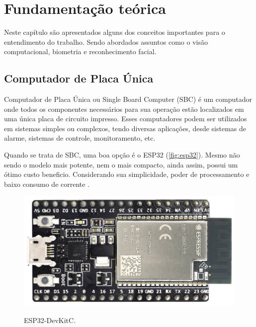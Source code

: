 \chapter{Fundamentação te\'orica}\label{cap:referencialTeorico}

Neste capítulo são apresentados alguns dos conceitos importantes para o entendimento
do trabalho. Sendo abordados assuntos como o visão computacional, biometria e 
reconhecimento facial.

\section{Computador de Placa Única}\label{sec:formatacaoTexto3}

Computador de Placa Única ou Single Board Computer (SBC) é um computador onde todos 
os componentes necessários para sua operação estão localizados em uma única placa de 
circuito impresso. Esses computadores podem ser utilizados em sistemas simples ou complexos, 
tendo diversas aplicações, desde sistemas de alarme, sistemas de controle, 
monitoramento, etc.

Quando se trata de SBC, uma boa opção é o ESP32 (\autoref{fig:esp32}). Mesmo não 
sendo o modelo mais potente, nem o mais compacto, ainda assim, possui um ótimo custo 
beneficio. Considerando sua simplicidade, poder de processamento e baixo consumo 
de corrente \cite{espressif2022c}.

\begin{figure}[h!]
    \centering
    \caption{ESP32-DevKitC.}
    \includegraphics[scale=0.13]{figuras/esp323.png} 
    \label{fig:esp32}
    \centering
\end{figure}

